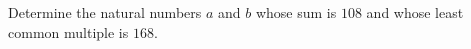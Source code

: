 Determine the natural numbers $a$ and $b$ whose sum is $108$ and whose least common multiple is $168$.
